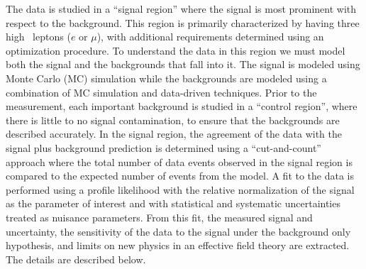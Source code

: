 The data is studied in a ``signal region'' where the signal is most prominent
with respect to the background.  This region is primarily characterized
by having three high \pt~leptons ($e$ or $\mu$), with additional
requirements determined using an optimization procedure.
To understand the data in this region we must model 
both the signal and the backgrounds that fall into it.
The signal is modeled using Monte Carlo (MC) simulation 
while the backgrounds are modeled using a combination of MC
simulation and data-driven techniques.
Prior to the measurement, each important background is 
studied in a ``control region'', where there is little to no signal contamination,
to ensure that the backgrounds are described accurately.
In the signal region, the agreement of the data 
with the signal plus background prediction is determined using 
a ``cut-and-count'' approach where the total number of data 
events observed in the signal region is compared to the expected number
of events from the model.
A fit to the data is performed using a profile likelihood
with the relative normalization of the signal as 
the parameter of interest and with statistical and systematic 
uncertainties treated as nuisance parameters.
From this fit, the measured signal \xsec and uncertainty,
the sensitivity of the data to the signal 
under the background only hypothesis,
and limits on new physics in an effective field theory 
are extracted.
The details are described below.



                                                                                










%







